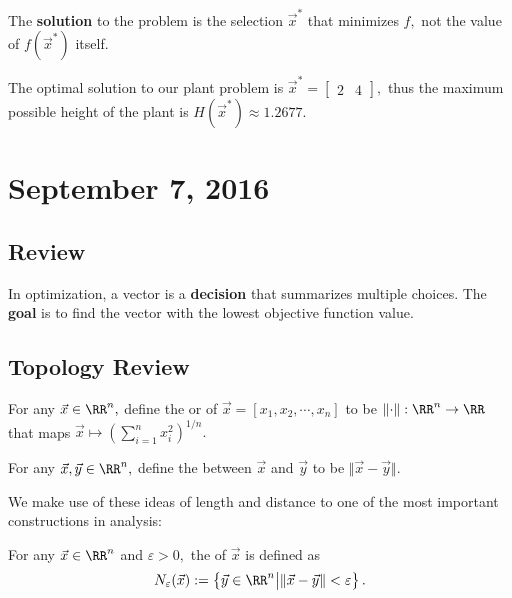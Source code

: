 \documentclass{article}
\begin{document}
\begin{remark}[Warning]
	The \textbf{solution} to the problem is the selection $\vec{x}^*$ that minimizes $f,$ not the value of $f(\vec{x}^*)$ itself.
\end{remark}

\begin{example}
	The optimal solution to our plant problem is $\vec{x}^*=\begin{bmatrix}
		2 & 4
	\end{bmatrix},$ thus the maximum possible height of the plant is $H(\vec{x}^*)\approx1.2677.$
\end{example}


\newpage

\section{September 7, 2016}
\subsection{Review}
In optimization, a vector is a \textbf{decision} that summarizes multiple choices. The \textbf{goal} is to find the vector with the lowest objective function value.

\subsection{Topology Review}
\begin{definition}
	For any $\vec{x}\in\RR^n,$ define the  or  of $\vec{x}=[x_1, x_2, \cdots, x_n]$ to be $\left\Vert \cdot \right\Vert : \RR^n\to\RR$ that maps $\displaystyle\vec{x}\mapsto \left( \sum_{i=1}^n x_i^2 \right)^{1/n}.$
\end{definition}

\begin{definition}
	For any $\vec{x}, \vec{y}\in\RR^n,$ define the  between $\vec{x}$ and $\vec{y}$ to be $\Vert \vec{x}-\vec{y}\Vert.$
\end{definition}

We make use of these ideas of length and distance to one of the most important constructions in analysis:

\begin{definition}
	For any $\vec{x}\in\RR^n$ and $\varepsilon>0,$ the  of $\vec{x}$ is defined as \[N_{\varepsilon}(\vec{x}) := \left\{\vec{y}\in\RR^n \big\vert \Vert \vec{x}-\vec{y}\Vert < \varepsilon\right\}. \]
\end{definition}
\end{document}

